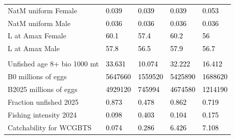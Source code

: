 \documentclass[
]{scrartcl}
\begin{document}
\begin{landscape}
\begin{longtable}[t]{ll>{\raggedright\arraybackslash}p{5em}>{\raggedright\arraybackslash}p{5em}>{\raggedright\arraybackslash}p{5em}}
\hspace{1em}NatM uniform Female & \textcolor{black}{0.039} & \textcolor{black}{0.039} & \textcolor{black}{0.039} & \textcolor{black}{0.053}\\
\hspace{1em}NatM uniform Male & \textcolor{black}{0.036} & \textcolor{black}{0.036} & \textcolor{black}{0.036} & \textcolor{black}{0.036}\\
\hspace{1em}L at Amax Female & \textcolor{black}{60.1} & \textcolor{black}{57.4} & \textcolor{black}{60.2} & \textcolor{black}{56}\\
\hspace{1em}L at Amax Male & \textcolor{black}{57.8} & \textcolor{black}{56.5} & \textcolor{black}{57.9} & \textcolor{black}{56.7}\\
\addlinespace[0.3em]
\multicolumn{5}{l}{\textbf{Estimates of derived quantities}}\\
\hspace{1em}Unfished age 8+ bio 1000 mt & \textcolor{black}{33.631} & \textcolor{black}{10.074} & \textcolor{black}{32.222} & \textcolor{black}{16.412}\\
\hspace{1em}B0 millions of eggs & \textcolor{black}{5647660} & \textcolor{black}{1559520} & \textcolor{black}{5425890} & \textcolor{black}{1688620}\\
\hspace{1em}B2025 millions of eggs & \textcolor{black}{4929120} & \textcolor{black}{745994} & \textcolor{black}{4674580} & \textcolor{black}{1214190}\\
\hspace{1em}Fraction unfished 2025 & \textcolor{black}{0.873} & \textcolor{black}{0.478} & \textcolor{black}{0.862} & \textcolor{black}{0.719}\\
\hspace{1em}Fishing intensity 2024 & \textcolor{black}{0.098} & \textcolor{black}{0.403} & \textcolor{black}{0.104} & \textcolor{black}{0.175}\\
\hspace{1em}Catchability for WCGBTS & \textcolor{black}{0.074} & \textcolor{black}{0.286} & \textcolor{black}{6.426} & \textcolor{black}{7.108}\\
\bottomrule

\end{longtable}

\endgroup{}


\end{landscape}
\end{document}
